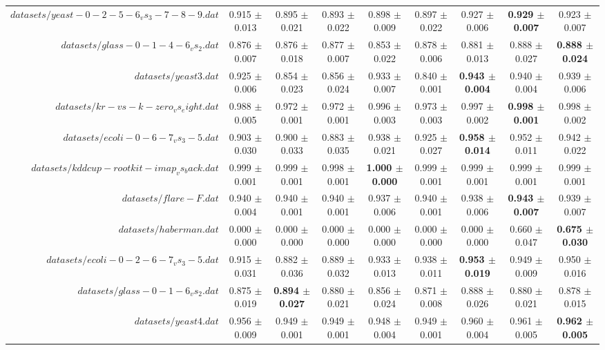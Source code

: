 \begin{table}[!ht]
{\begin{tabular}{r c c c c c c c c}
$datasets/yeast-0-2-5-6_vs_3-7-8-9.dat$ & 0.915 $\pm$ 0.013 & 0.895 $\pm$ 0.021 & 0.893 $\pm$ 0.022 & 0.898 $\pm$ 0.009 & 0.897 $\pm$ 0.022 & 0.927 $\pm$ 0.006 & \textbf{0.929 $\pm$ 0.007} & 0.923 $\pm$ 0.007 \\
$datasets/glass-0-1-4-6_vs_2.dat$ & 0.876 $\pm$ 0.007 & 0.876 $\pm$ 0.018 & 0.877 $\pm$ 0.007 & 0.853 $\pm$ 0.022 & 0.878 $\pm$ 0.006 & 0.881 $\pm$ 0.013 & 0.888 $\pm$ 0.027 & \textbf{0.888 $\pm$ 0.024} \\
$datasets/yeast3.dat$ & 0.925 $\pm$ 0.006 & 0.854 $\pm$ 0.023 & 0.856 $\pm$ 0.024 & 0.933 $\pm$ 0.007 & 0.840 $\pm$ 0.001 & \textbf{0.943 $\pm$ 0.004} & 0.940 $\pm$ 0.004 & 0.939 $\pm$ 0.006 \\
$datasets/kr-vs-k-zero_vs_eight.dat$ & 0.988 $\pm$ 0.005 & 0.972 $\pm$ 0.001 & 0.972 $\pm$ 0.001 & 0.996 $\pm$ 0.003 & 0.973 $\pm$ 0.003 & 0.997 $\pm$ 0.002 & \textbf{0.998 $\pm$ 0.001} & 0.998 $\pm$ 0.002 \\
$datasets/ecoli-0-6-7_vs_3-5.dat$ & 0.903 $\pm$ 0.030 & 0.900 $\pm$ 0.033 & 0.883 $\pm$ 0.035 & 0.938 $\pm$ 0.021 & 0.925 $\pm$ 0.027 & \textbf{0.958 $\pm$ 0.014} & 0.952 $\pm$ 0.011 & 0.942 $\pm$ 0.022 \\
$datasets/kddcup-rootkit-imap_vs_back.dat$ & 0.999 $\pm$ 0.001 & 0.999 $\pm$ 0.001 & 0.998 $\pm$ 0.001 & \textbf{1.000 $\pm$ 0.000} & 0.999 $\pm$ 0.001 & 0.999 $\pm$ 0.001 & 0.999 $\pm$ 0.001 & 0.999 $\pm$ 0.001 \\
$datasets/flare-F.dat$ & 0.940 $\pm$ 0.004 & 0.940 $\pm$ 0.001 & 0.940 $\pm$ 0.001 & 0.937 $\pm$ 0.006 & 0.940 $\pm$ 0.001 & 0.938 $\pm$ 0.006 & \textbf{0.943 $\pm$ 0.007} & 0.939 $\pm$ 0.007 \\
$datasets/haberman.dat$ & 0.000 $\pm$ 0.000 & 0.000 $\pm$ 0.000 & 0.000 $\pm$ 0.000 & 0.000 $\pm$ 0.000 & 0.000 $\pm$ 0.000 & 0.000 $\pm$ 0.000 & 0.660 $\pm$ 0.047 & \textbf{0.675 $\pm$ 0.030} \\
$datasets/ecoli-0-2-6-7_vs_3-5.dat$ & 0.915 $\pm$ 0.031 & 0.882 $\pm$ 0.036 & 0.889 $\pm$ 0.032 & 0.933 $\pm$ 0.013 & 0.938 $\pm$ 0.011 & \textbf{0.953 $\pm$ 0.019} & 0.949 $\pm$ 0.009 & 0.950 $\pm$ 0.016 \\
$datasets/glass-0-1-6_vs_2.dat$ & 0.875 $\pm$ 0.019 & \textbf{0.894 $\pm$ 0.027} & 0.880 $\pm$ 0.021 & 0.856 $\pm$ 0.024 & 0.871 $\pm$ 0.008 & 0.888 $\pm$ 0.026 & 0.880 $\pm$ 0.021 & 0.878 $\pm$ 0.015 \\
$datasets/yeast4.dat$ & 0.956 $\pm$ 0.009 & 0.949 $\pm$ 0.001 & 0.949 $\pm$ 0.001 & 0.948 $\pm$ 0.004 & 0.949 $\pm$ 0.001 & 0.960 $\pm$ 0.004 & 0.961 $\pm$ 0.005 & \textbf{0.962 $\pm$ 0.005} \\

\end{tabular}}
\end{table}
